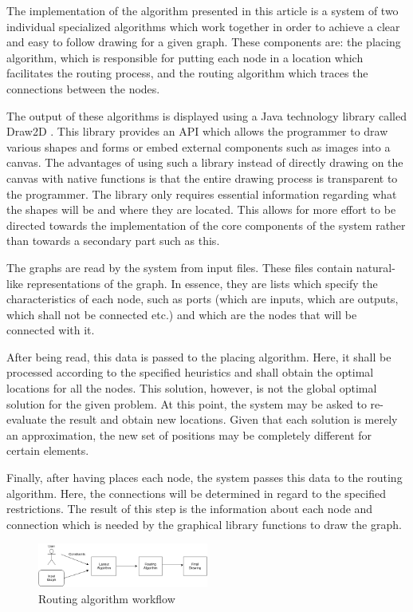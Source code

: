 \label{chap:arch}

The implementation of the algorithm presented in this article is a system of two individual 
specialized algorithms which work together in order to achieve a clear and easy to follow drawing for a given graph.
 These components are: the placing algorithm, which is responsible for putting each node in a location
which facilitates the routing process, and the routing algorithm which traces the
connections between the nodes. 

The output of these algorithms is displayed using a Java technology library called Draw2D \cite{wurthinger2006visualization}.
This library provides an API which allows the programmer to draw various shapes and forms or
embed external components such as images into a canvas. The advantages of using such a 
library instead of directly drawing on the canvas with native functions is that the entire
drawing process is transparent to the programmer. The library only requires essential 
information regarding what the shapes will be and where they are located. This allows for 
more effort to be directed towards the implementation of the core components of the system
rather than towards a secondary part such as this.

The graphs are read by the system from input files. These files contain natural-like
representations of the graph. In essence, they are lists which specify the characteristics
of each node, such as ports (which are inputs, which are outputs, which shall not be 
connected etc.) and which are the nodes that will be connected with it.

After being read, this data is passed to the placing algorithm. Here, it shall be processed 
according to the specified heuristics and shall obtain the optimal locations for all the
nodes. This solution, however, is not the global optimal solution for the given problem. At 
this point, the system may be asked to re-evaluate the result and obtain new locations. Given
that each solution is merely an approximation, the new set of positions may be completely
different for certain elements.

Finally, after having places each node, the system passes this data to the routing algorithm.
Here, the connections will be determined in regard to the specified restrictions. The result of 
this step is the information about each node and connection which is needed by the graphical
library functions to draw the graph.

\begin{figure}[ht] \centering
\includegraphics[width=0.5\textwidth]{src/systemWorkflow.png}
\caption{Routing algorithm workflow} \end{figure}
